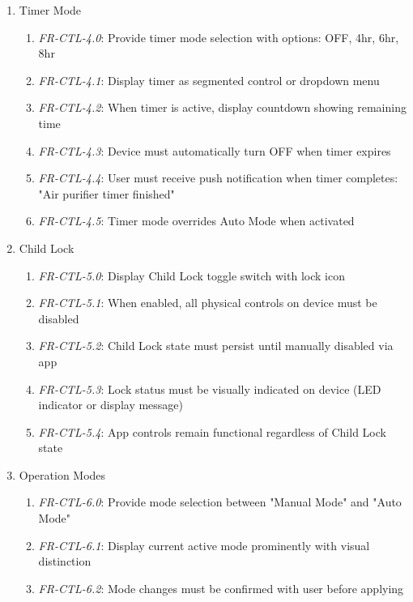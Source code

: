 \documentclass[conference]{IEEEtran}
\begin{document}
\begin{enumerate}
\begin{enumerate}
                        \end{enumerate} 
                    \item Timer Mode
                        \begin{enumerate}
                            \item \textit{FR-CTL-4.0}: Provide timer mode selection with options: OFF, 4hr, 6hr, 8hr
                            \item \textit{FR-CTL-4.1}: Display timer as segmented control or dropdown menu
                            \item \textit{FR-CTL-4.2}: When timer is active, display countdown showing remaining time
                            \item \textit{FR-CTL-4.3}: Device must automatically turn OFF when timer expires
                            \item \textit{FR-CTL-4.4}: User must receive push notification when timer completes: "Air purifier timer finished"
                            \item \textit{FR-CTL-4.5}: Timer mode overrides Auto Mode when activated
                        \end{enumerate}            
                    \item Child Lock
                        \begin{enumerate}
                            \item \textit{FR-CTL-5.0}: Display Child Lock toggle switch with lock icon
                            \item \textit{FR-CTL-5.1}: When enabled, all physical controls on device must be disabled
                            \item \textit{FR-CTL-5.2}: Child Lock state must persist until manually disabled via app
                            \item \textit{FR-CTL-5.3}: Lock status must be visually indicated on device (LED indicator or display message)
                            \item \textit{FR-CTL-5.4}: App controls remain functional regardless of Child Lock state
                        \end{enumerate}
                    \item Operation Modes
                        \begin{enumerate}
                            \item \textit{FR-CTL-6.0}: Provide mode selection between "Manual Mode" and "Auto Mode"
                            \item \textit{FR-CTL-6.1}: Display current active mode prominently with visual distinction
                            \item \textit{FR-CTL-6.2}: Mode changes must be confirmed with user before applying
                        \end{enumerate}
                

\end{enumerate}
\end{document}
